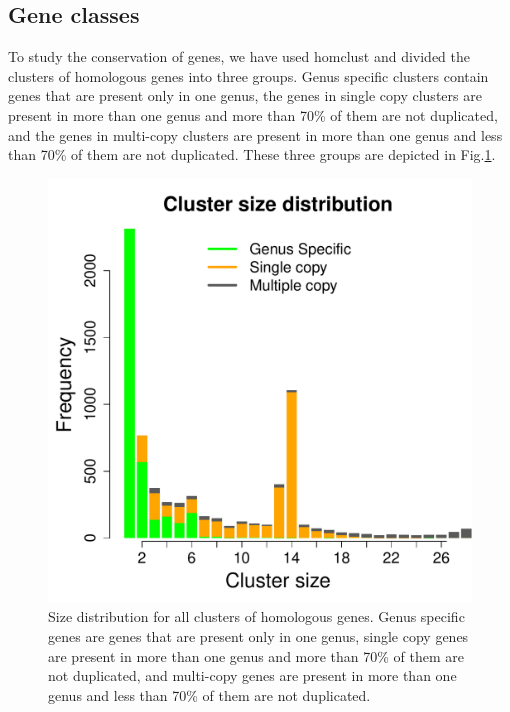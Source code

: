 \documentclass[12pt,letterpaper]{article}
\begin{document}
\subsection{Gene classes}
To study the conservation of genes, we have used homclust and divided the clusters of homologous genes into three groups. Genus specific clusters contain genes that are present only in one genus, the genes in single copy clusters are present in more than one genus and more than 70\% of them are not duplicated, and  the genes in multi-copy clusters are present in more than one genus and less than 70\% of them are not duplicated. These three groups are depicted in Fig.\@ \ref{fig:homclust-results}.

\begin{figure}
\includegraphics[scale=0.3]{cluster-size-dist.pdf}
\caption{Size distribution for all clusters of homologous genes. Genus specific genes are genes that are present only in one genus, single copy genes are present in more than one genus and more than 70\% of them are not duplicated, and multi-copy genes are present in more than one genus and less than 70\% of them are not duplicated.}
\label{fig:homclust-results}
\end{figure}
\end{document}
